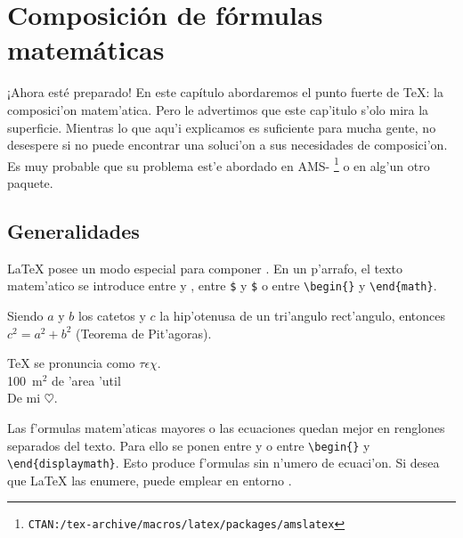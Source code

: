 \chapter{Composici\'on de f\'ormulas matem\'aticas}

\begin{intro}
 ¡Ahora est\'e preparado! En este cap\'itulo abordaremos el punto
  fuerte de \TeX: la composici'on matem'atica. Pero le advertimos que
  este cap'itulo s'olo mira la superficie. Mientras lo que aqu'i
  explicamos es suficiente para mucha gente, no desespere si no puede
  encontrar una soluci'on a sus necesidades de composici'on. Es muy
  probable que su problema est'e abordado en AMS-\LaTeXe
  \footnote{\texttt{CTAN:/tex-archive/macros/latex/packages/amslatex}}
  o en alg'un otro paquete.
\end{intro}
  
\section{Generalidades}

\LaTeX{} posee un modo especial para componer . En un
p'arrafo, el texto matem'atico se introduce entre \ci{(} y \ci{)},
entre \texttt{\$} y \texttt{\$} o entre
\verb|\begin{|\verb|}| y \verb|\end{math}|.

\begin{example}
Siendo $a$ y $b$ los catetos
y $c$ la hip'otenusa
de un tri'angulo rect'angulo,
entonces $c^{2}=a^{2}+b^{2}$
(Teorema de Pit'agoras).
\end{example}

\begin{example}
\TeX{} se pronuncia como
 $\tau\epsilon\chi$.\\[6pt]
100~m$^{2}$ de 'area 'util \\[6pt]
De mi $\heartsuit$.
\end{example}

Las f'ormulas matem'aticas mayores o las ecuaciones quedan mejor en
renglones separados del texto. Para ello se ponen entre \ci{[} y
\ci{]} o entre \verb|\begin{|\verb|}| y
  \verb|\end{displaymath}|. Esto produce f'ormulas sin n'umero de
ecuaci'on. Si desea que \LaTeX{} las enumere, puede emplear en entorno
.

